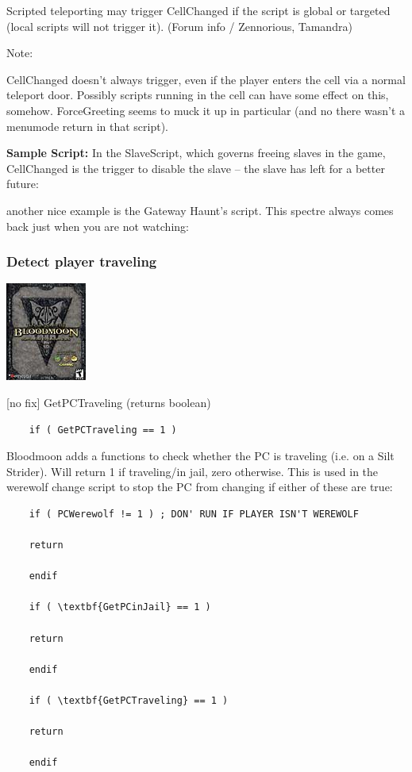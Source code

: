 Scripted teleporting may trigger CellChanged if the script is global or
targeted (local scripts will not trigger it). (Forum info / Zennorious,
Tamandra)

Note:

CellChanged doesn't always trigger, even if the player enters the cell
via a normal teleport door. Possibly scripts running in the cell can
have some effect on this, somehow. ForceGreeting seems to muck it up in
particular (and no there wasn't a menumode return in that script).

\textbf{Sample Script:} In the SlaveScript, which governs freeing slaves
in the game, CellChanged is the trigger to disable the slave -- the
slave has left for a better future:



another nice example is the Gateway Haunt's script. This spectre always
comes back just when you are not watching:



\hypertarget{detect-player-traveling}{%
\subsubsection{Detect player traveling}\label{detect-player-traveling}}

\includegraphics{media/image7.png}

{[}no fix{]} GetPCTraveling (returns boolean)

\begin{lstlisting}
	if ( GetPCTraveling == 1 )
\end{lstlisting}

Bloodmoon adds a functions to check whether the PC is traveling (i.e. on
a Silt Strider). Will return 1 if traveling/in jail, zero otherwise.
This is used in the werewolf change script to stop the PC from changing
if either of these are true:

\begin{lstlisting}
	if ( PCWerewolf != 1 ) ; DON' RUN IF PLAYER ISN'T WEREWOLF
	
	return
	
	endif
	
	if ( \textbf{GetPCinJail} == 1 )
	
	return
	
	endif
	
	if ( \textbf{GetPCTraveling} == 1 )
	
	return
	
	endif
\end{lstlisting}

